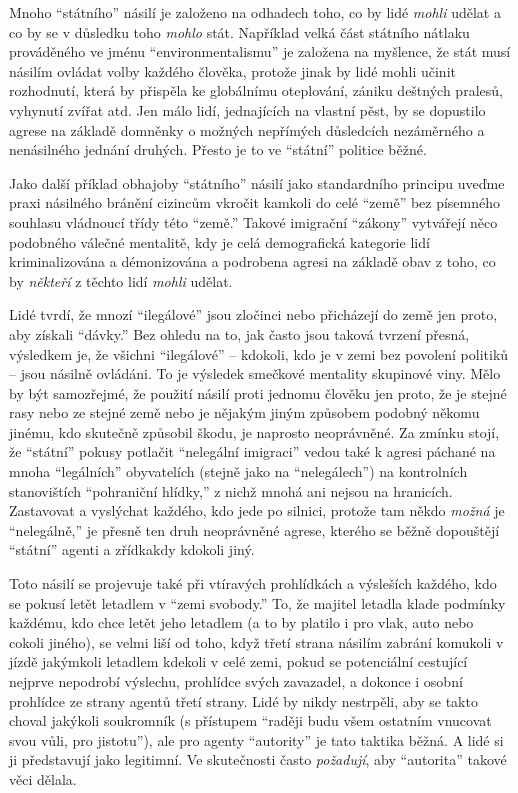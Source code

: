 \documentclass{book}
\begin{document}
Mnoho \enquote{státního} násilí je založeno na odhadech toho, co by lidé \emph{mohli} udělat a co by se v důsledku toho \emph{mohlo} stát. Například velká část státního nátlaku prováděného ve jménu \enquote{environmentalismu} je založena na myšlence, že stát musí násilím ovládat volby každého člověka, protože jinak by lidé mohli učinit rozhodnutí, která by přispěla ke globálnímu oteplování, zániku deštných pralesů, vyhynutí zvířat atd. Jen málo lidí, jednajících na vlastní pěst, by se dopustilo agrese na základě domněnky o možných nepřímých důsledcích nezáměrného a nenásilného jednání druhých. Přesto je to ve \enquote{státní} politice běžné.

Jako další příklad obhajoby \enquote{státního} násilí jako standardního principu uveďme praxi násilného bránění cizincům vkročit kamkoli do celé \enquote{země} bez písemného souhlasu vládnoucí třídy této \enquote{země.} Takové imigrační \enquote{zákony} vytvářejí něco podobného válečné mentalitě, kdy je celá demografická kategorie lidí kriminalizována a démonizována a podrobena agresi na základě obav z toho, co by \emph{někteří} z těchto lidí \emph{mohli} udělat.

Lidé tvrdí, že mnozí \enquote{ilegálové} jsou zločinci nebo přicházejí do země jen proto, aby získali \enquote{dávky.} Bez ohledu na to, jak často jsou taková tvrzení přesná, výsledkem je, že všichni \enquote{ilegálové} -- kdokoli, kdo je v zemi bez povolení politiků -- jsou násilně ovládáni. To je výsledek smečkové mentality skupinové viny. Mělo by být samozřejmé, že použití násilí proti jednomu člověku jen proto, že je stejné rasy nebo ze stejné země nebo je nějakým jiným způsobem podobný někomu jinému, kdo skutečně způsobil škodu, je naprosto neoprávněné. Za zmínku stojí, že \enquote{státní} pokusy potlačit \enquote{nelegální imigraci} vedou také k agresi páchané na mnoha \enquote{legálních} obyvatelích (stejně jako na \enquote{nelegálech}) na kontrolních stanovištích \enquote{pohraniční hlídky,} z nichž mnohá ani nejsou na hranicích. Zastavovat a vyslýchat každého, kdo jede po silnici, protože tam někdo \emph{možná} je \enquote{nelegálně,} je přesně ten druh neoprávněné agrese, kterého se běžně dopouštějí \enquote{státní} agenti a zřídkakdy kdokoli jiný.

Toto násilí se projevuje také při vtíravých prohlídkách a výsleších každého, kdo se pokusí letět letadlem v \enquote{zemi svobody.} To, že majitel letadla klade podmínky každému, kdo chce letět jeho letadlem (a to by platilo i pro vlak, auto nebo cokoli jiného), se velmi liší od toho, když třetí strana násilím zabrání komukoli v jízdě jakýmkoli letadlem kdekoli v celé zemi, pokud se potenciální cestující nejprve nepodrobí výslechu, prohlídce svých zavazadel, a dokonce i osobní prohlídce ze strany agentů třetí strany. Lidé by nikdy nestrpěli, aby se takto choval jakýkoli soukromník (s přístupem \enquote{raději budu všem ostatním vnucovat svou vůli, pro jistotu}), ale pro agenty \enquote{autority} je tato taktika běžná. A lidé si ji představují jako legitimní. Ve skutečnosti často \emph{požadují}, aby \enquote{autorita} takové věci dělala.
\end{document}
